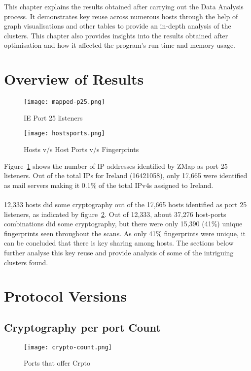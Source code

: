 This chapter explains the results obtained after carrying out the Data Analysis process. It demonstrates key reuse across numerous hosts 
through the help of graph visualisations and other tables to provide an in-depth analysis of the clusters. This chapter also provides 
insights into the results obtained after optimisation and how it affected the program's run time and memory usage.

\section{Overview of Results}
\label{overview}
\begin{figure}[h!]
    \centering
    \texttt{[image: mapped-p25.png]}
    \caption{IE Port 25 listeners}
    \label{fig:mappedp25}
\end{figure}
\pagebreak

\begin{figure}[h!]
    \centering
    \texttt{[image: hostsports.png]}
    \caption{Hosts v/s Host Ports v/s Fingerprints}
    \label{fig:hostports}
\end{figure}

\noindent Figure~\ref{fig:mappedp25} shows the number of IP addresses identified by ZMap as port 25 listeners. Out of the total IPs for Ireland (16421058), only 17,665 
were identified as mail servers making it 0.1\% of the total IPv4s assigned to Ireland.\\\\
12,333 hosts did some cryptography out of the 17,665 hosts identified as port 25 listeners, as indicated by figure~\ref*{fig:hostports}. 
Out of 12,333, about 37,276 host-ports combinations did some cryptography, but there were only 15,390 (41\%) unique fingerprints seen throughout the scans.
As only 41\% fingerprints were unique, it can be concluded that there is key sharing among hosts. The sections below further analyse this key 
reuse and provide analysis of some of the intriguing clusters found. 

\section{Protocol Versions}

\subsection{Cryptography per port Count}
\begin{figure}[h!]
    \centering
    \texttt{[image: crypto-count.png]}
    \caption{Ports that offer Crpto}
    \label{fig:cryptocount}
\end{figure}

